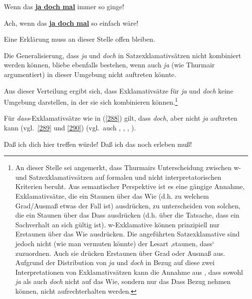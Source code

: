 {\begin{exe}
	\ex\label{286} 
	Wenn das \underline{\textbf{ja doch mal}} immer so ginge!
\end{exe}
\vspace{-0.4cm}
\begin{exe}
	\ex\label{287} 
	Ach, wenn das \underline{\textbf{ja doch mal}} so einfach wäre!
\end{exe}
Eine Erklärung muss an dieser Stelle offen bleiben.} Die Genera\-lisierung, dass \textit{ja} und \textit{doch} in Satzexklamativsätzen nicht kombiniert werden können, bliebe ebenfalls bestehen, wenn auch \textit{ja} (wie Thurmair argumentiert) in dieser Umgebung nicht auftreten könnte. 
									        
Aus dieser Verteilung ergibt sich, dass Exklamativsätze für \textit{ja} und \textit{doch} keine Umgebung darstellen, in der sie sich kombinieren können.\footnote{\label{Fn4}An dieser Stelle sei angemerkt, dass Thurmairs Unterscheidung zwischen w- und Satzexklamativsätzen auf formalen und nicht interpretatorischen Kriterien beruht. Aus semantischer Perspektive ist es eine gängige Annahme, Exklamativsätze, die ein Staunen über das Wie (d.h. zu welchem Grad/Ausmaß etwas der Fall ist) ausdrücken, zu unterscheiden von solchen, die ein Staunen über das Dass ausdrücken (d.h. über die Tatsache, dass ein Sachverhalt an sich gültig ist). w-Exklamative können prinzipiell nur Erstaunen über das Wie ausdrücken. Die angeführten Satzexklamative sind jedoch nicht (wie man vermuten könnte) der Lesart ‚staunen, dass‘  zuzuordnen. Auch sie drücken Erstaunen über Grad oder Ausmaß aus. Aufgrund der Distribution von \textit{ja} und \textit{doch} in Bezug auf diese zwei Interpretationen von Exklamativsätzen kann die Annahme aus \citet[161]{Hentschel1986}, dass sowohl \textit{ja} als auch \textit{doch} nicht auf das Wie, sondern nur das Dass Bezug nehmen können, nicht aufrechterhalten werden.}
	
Für \textit{dass}-Exklamativsätze  wie in (\ref{288}) gilt, dass \textit{doch}, aber nicht \textit{ja} auftreten kann (vgl.\ \ref{289} und \ref{290}) (vgl.\ auch \citealt[109, Fn 49]{Doherty1985}, \citealt[152]{Zaefferer1988}, \citealt[135]{Meibauer1994}, \citealt[222]{Kwon2005}).

\begin{exe}
	\ex\label{288} 
		\begin{xlist}	
			\ex\label{288a} Daß ich dich hier treffen würde!
			\ex\label{288b} Daß ich das noch erleben muß!
		\end{xlist}
\end{exe}

